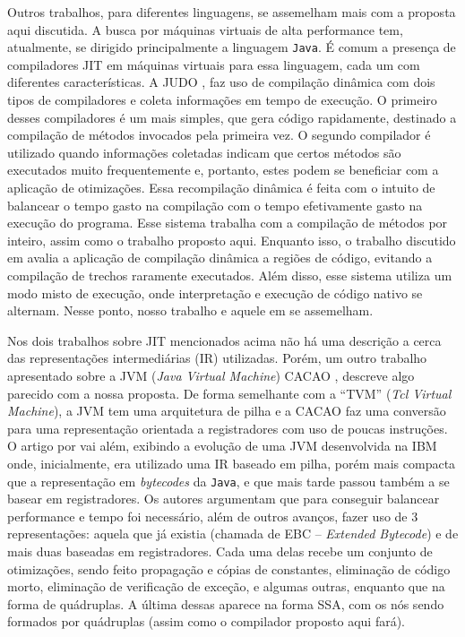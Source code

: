 Outros trabalhos, para diferentes linguagens, se assemelham mais com a
proposta aqui discutida. A busca por máquinas virtuais de alta
performance tem, atualmente, se dirigido principalmente a linguagem
\texttt{Java}. É comum a presença de compiladores JIT em máquinas
virtuais para essa linguagem, cada um com diferentes
características. A JUDO \cite{judo}, faz uso
de compilação dinâmica com dois tipos de compiladores e coleta
informações em tempo de execução. O primeiro desses compiladores é um
mais simples, que gera código rapidamente, destinado a compilação
de métodos invocados pela primeira vez. O segundo compilador é
utilizado quando informações coletadas indicam que certos métodos
são executados muito frequentemente e, portanto, estes podem se
beneficiar com a aplicação de otimizações. Essa recompilação dinâmica
é feita com o intuito de balancear o tempo gasto na compilação com o tempo
efetivamente gasto na execução do programa. Esse sistema trabalha com
a compilação de métodos por inteiro, assim como o trabalho proposto
aqui. Enquanto isso, o trabalho discutido em \cite{suganuma_pldi_2003}
avalia a aplicação de compilação dinâmica a regiões de código, evitando
a compilação de trechos raramente executados. Além disso, esse sistema
utiliza um modo misto de execução, onde interpretação e execução de
código nativo se alternam. Nesse ponto, nosso trabalho e aquele em
\cite{suganuma_pldi_2003} se assemelham.

Nos dois trabalhos sobre JIT mencionados acima não há uma descrição
a cerca das representações intermediárias (IR) utilizadas. Porém, um
outro trabalho
apresentado sobre a JVM (\textit{Java Virtual Machine}) CACAO \cite{cacao},
descreve algo parecido com a nossa proposta. De forma semelhante com a
``TVM'' (\textit{Tcl Virtual Machine}), a JVM tem uma arquitetura de
pilha e a CACAO faz uma conversão para uma representação orientada a
registradores com uso de poucas instruções. O artigo por
 vai além, exibindo a evolução de uma JVM
desenvolvida na IBM onde, inicialmente, era utilizado uma IR baseado
em pilha, porém mais compacta que a representação em \textit{bytecodes} da
\texttt{Java}, e que mais tarde passou também a se basear em
registradores. Os autores argumentam que para conseguir balancear
performance e tempo foi necessário, além de outros avanços, fazer uso
de 3 representações: aquela que já existia (chamada de EBC --
\textit{Extended Bytecode}) e de mais duas baseadas em
registradores. Cada uma delas recebe um conjunto de otimizações, sendo
feito propagação e cópias de constantes, eliminação de código morto,
eliminação de verificação de exceção, e algumas outras, enquanto que na
forma de quádruplas. A última dessas aparece na forma SSA, com os nós
sendo formados por quádruplas (assim como o compilador proposto aqui fará).


